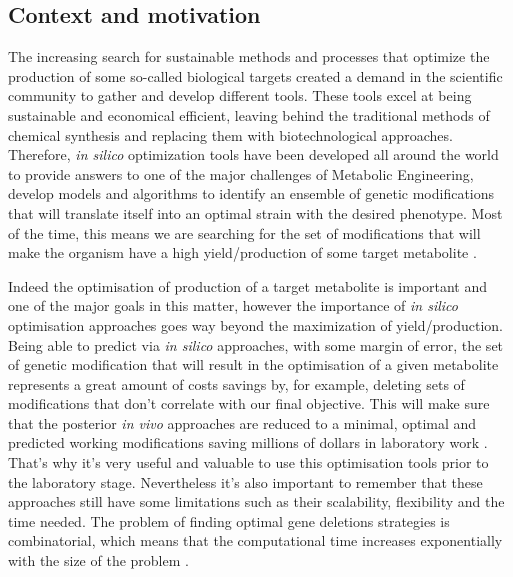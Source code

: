 \documentclass[runningheads]{llncs}
\begin{document}
\subsection{Context and motivation}
\hspace{0.5cm}The increasing search for sustainable methods and processes that optimize the production of some so-called biological targets created a demand in the scientific community to gather and develop different tools. These tools excel at being sustainable and economical efficient, leaving behind the traditional methods of chemical synthesis and replacing them with biotechnological approaches. Therefore, \emph{in silico} optimization tools have been developed all around the world to provide answers to one of the major challenges of Metabolic Engineering, develop models and algorithms to identify an ensemble of genetic modifications that will translate itself into an optimal strain with the desired phenotype. Most of the time, this means we are searching for the set of modifications that will make the organism have a high yield/production of some target metabolite \cite{rocha2008natural}.

Indeed the optimisation of production of a target metabolite is important and one of the major goals in this matter, however the importance of \emph{in silico} optimisation approaches goes way beyond the maximization of yield/production. Being able to predict via \emph{in silico} approaches, with some margin of error, the set of genetic modification that will result in the optimisation of a given metabolite represents a great amount of costs savings by, for example, deleting sets of modifications that don't correlate with our final objective. This will make sure that the posterior \emph{in vivo} approaches are reduced to a minimal, optimal and predicted working modifications saving millions of dollars in laboratory work \cite{yee2012current}. That's why it's very useful and valuable to use this optimisation tools prior to the laboratory stage. Nevertheless it's also important to remember that these approaches still have some limitations such as their scalability, flexibility and the time needed. The problem of finding optimal gene deletions strategies is combinatorial, which means that the computational time increases exponentially with the size of the problem \cite{rochasilicolife,patil2005evolutionary}.
\end{document}
